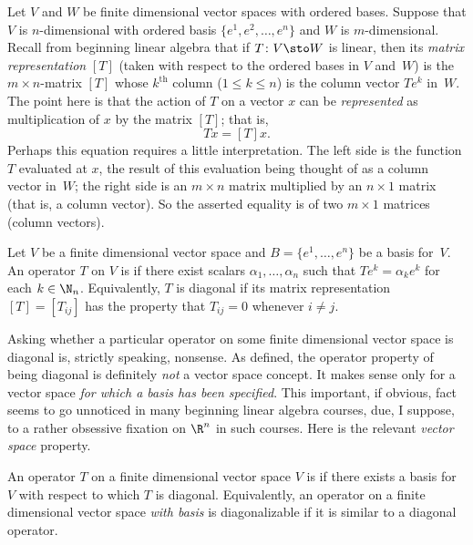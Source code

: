 Let $V$ and $W$ be finite dimensional vector spaces with ordered bases. Suppose that $V$ is $n$-dimensional with ordered basis
$\{e^1,e^2, \dots,e^n\}$ and $W$ is $m$-dimensional. Recall from beginning linear algebra that if $T\colon V \sto W$ is linear,
then its
\emph{matrix representation} $[T]$ (taken with respect to the ordered bases in $V$ and~$W$) is the $m \times n$-matrix $[T]$
whose $k^{\text{th}}$ column ($1 \le k \le n$) is the column vector $Te^k$ in~$W$.  The point here is that the action of $T$ on
a vector $x$ can be \emph{represented} as multiplication of $x$ by the matrix $[T]$; that is,
   \[ Tx = [T]x. \]
Perhaps this equation requires a little interpretation. The left side is the function $T$ evaluated at $x$, the
result of this evaluation being thought of as a column vector in~$W$; the right side is an $m \times n$ matrix multiplied
by an $n \times 1$ matrix (that is, a column vector).  So the asserted equality is of two $m \times 1$ matrices (column vectors).

\begin{defn} Let $V$ be a finite dimensional vector space and $B = \{e^1, \dots, e^n\}$ be a basis for~$V$.  An operator $T$ on $V$ is
 if there exist scalars $\alpha_1, \dots, \alpha_n$ such that $Te^k =
\alpha_ke^k$ for each $k \in \N_n$. Equivalently, $T$ is diagonal if its matrix
representation $[T] = [T_{ij}]$ has the property that $T_{ij} = 0$ whenever $i \ne j$.
\end{defn}

Asking whether a particular operator on some finite dimensional vector space is diagonal
is, strictly speaking, nonsense. As defined, the operator property of being diagonal is
definitely \emph{not} a vector space concept. It makes sense only for a vector space
\emph{for which a basis has been specified}.  This important, if obvious, fact seems to
go unnoticed in many beginning linear algebra courses, due, I suppose, to a rather obsessive
fixation on $\R^n$ in such courses. Here is the relevant \emph{vector space} property.

\begin{defn} An operator $T$ on a finite dimensional vector space $V$ is
 if there exists a basis for $V$ with respect to which $T$ is
diagonal. Equivalently, an operator on a finite dimensional vector space \emph{with
basis} is diagonalizable if it is similar to a diagonal operator.
\end{defn}

